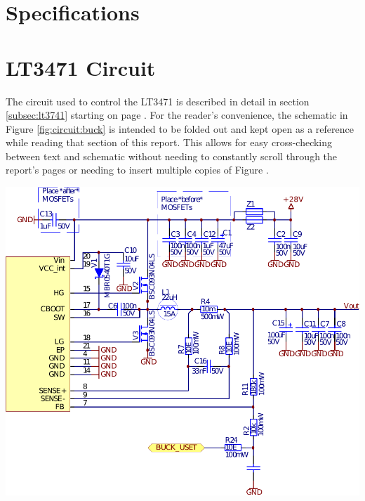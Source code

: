 \clearpage
\section{Specifications}
\label{appendix:specs}



{%
    \clearpage
    \pdfpagewidth
    \textwidth
    \addtolength{\textwidth}{50mm}

    \section{LT3471 Circuit}
    \label{appendix:lt3741:circuit}

    \begin{minipage}[b]{.45\textwidth}
        The   circuit    used   to    control   the   LT3471    is   described
        in   detail   in   section  \ref{subsec:lt3741}   starting   on   page
        \pageref{subsec:lt3741}. For the  reader's convenience,  the schematic
        in Figure \ref{fig:circuit:buck} is intended to be folded out and kept
        open as  a reference while  reading that section of  this report. This
        allows  for easy  cross-checking  between text  and schematic  without
        needing to constantly scroll through  the report's pages or needing to
        insert multiple copies of Figure \label{fig:circuit:buck}.
    \end{minipage}%
    \begin{minipage}[b]{.55\textwidth}
        \center
        \includegraphics[width=.67\textwidth]{images/circuit/buck.pdf}
        \label{fig:circuit:buck}
    \end{minipage}

\clearpage
}

